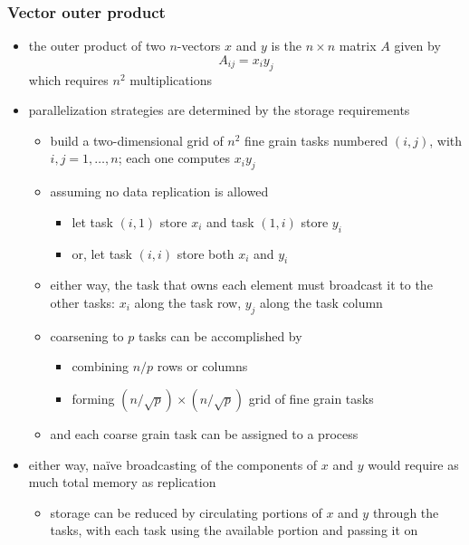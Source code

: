 \begin{frame}[fragile]
%
  \frametitle{Vector outer product}
%
  \begin{itemize}
%
  \item the outer product of two $n$-vectors $x$ and $y$ is the $n \times n$ matrix $A$ given
    by
    \begin{equation*}
      A_{ij} = x_{i} y_{j}
    \end{equation*}
    which requires $n^{2}$ multiplications
%
  \item parallelization strategies are determined by the storage requirements
    \begin{itemize}
    \item build a two-dimensional grid of $n^{2}$ fine grain tasks numbered $(i,j)$, with $i,j
      = 1, \ldots, n$; each one computes $x_{i}y_{j}$
    \item assuming no data replication is allowed
      \begin{itemize}
      \item let task $(i,1)$ store $x_{i}$ and task $(1,i)$ store $y_{i}$
      \item or, let task $(i,i)$ store both $x_{i}$ and $y_{i}$
      \end{itemize}
    \item either way, the task that owns each element must broadcast it to the other tasks:
      $x_{i}$ along the  task row, $y_{j}$ along the  task column
    \item coarsening to $p$ tasks can be accomplished by
      \begin{itemize}
      \item combining $n/p$ rows or columns
      \item forming $(n/\sqrt{p}) \times (n/\sqrt{p})$ grid of fine grain tasks
      \end{itemize}
    \item and each coarse grain task can be assigned to a process
    \end{itemize}
%
  \item either way, na\"ive broadcasting of the components of $x$ and $y$ would require as much
    total memory as replication
    \begin{itemize}
    \item storage can be reduced by circulating portions of $x$ and $y$ through the tasks, with
      each task using the available portion and passing it on
    \end{itemize}
%
  \end{itemize}
%
\end{frame}

